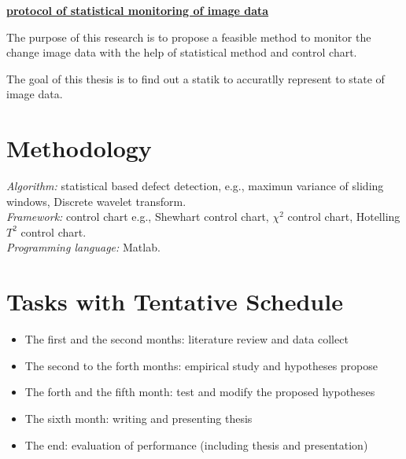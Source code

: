 \thispagestyle{empty}
\underline{\large{\textbf{protocol of statistical monitoring of image data}}}

\vspace{1cm}
The purpose of this research is to propose a feasible method to monitor the change image data with the help of statistical method and control chart. 

The goal of this thesis is to find out a statik to accuratlly represent to state of image data.



\section*{Methodology}
\textit{Algorithm:} statistical based defect detection, e.g., maximun variance of sliding windows, Discrete wavelet transform. \\
\textit{Framework:} control chart e.g., Shewhart control chart, $\chi^{2}$ control chart, Hotelling $T^{2}$ control chart.   \\
\textit{Programming language:} Matlab.


\section*{Tasks with Tentative Schedule}
\begin{itemize}
    \item The first and the second months: literature review and data collect
    \item The second to the forth months: empirical study and hypotheses propose
    \item The forth and the fifth month: test and modify the proposed hypotheses
    \item The sixth month: writing and presenting thesis
    \item The end: evaluation of performance (including thesis and presentation)
\end{itemize}


